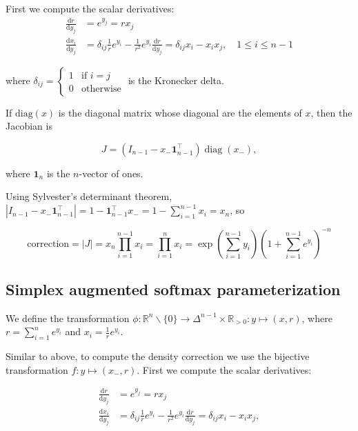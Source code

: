 \documentclass[twoside]{article}
\begin{document}
First we compute the scalar derivatives:
$$
\begin{aligned}
    \frac{\mathrm{d} r}{\mathrm{d} y_j} &= e^{y_j} = r x_j\\
    \frac{\mathrm{d} x_i}{\mathrm{d} y_j} &= \delta_{ij} \frac{1}{r} e^{y_i} - \frac{1}{r^2} e^{y_i} \frac{\mathrm{d} r}{\mathrm{d} y_j} = \delta_{ij} x_i - x_i x_j, \quad 1 \le i \le n-1
\end{aligned}
$$

where $\delta_{ij} = \begin{cases} 1 &\text{if } i = j \\ 0 &\text{otherwise}\end{cases}$ is the Kronecker delta.

If $\mathrm{diag}(x)$ is the diagonal matrix whose diagonal are the elements of $x$, then the Jacobian is

$$J = (I_{n-1} - x_- \boldsymbol{1}_{n-1}^\top) \operatorname{diag}(x_-),$$

where $\boldsymbol{1}_n$ is the $n$-vector of ones.

Using Sylvester's determinant theorem, $|I_{n-1} - x_- \boldsymbol{1}_{n-1}^\top| = 1 - \boldsymbol{1}_{n-1}^\top x_- = 1 - \sum_{i=1}^{n-1} x_i = x_n$, so

$$\mathrm{correction} = |J| = x_n \prod_{i=1}^{n-1} x_i = \prod_{i=1}^{n} x_i = \exp\left(\sum_{i=1}^{n-1} y_i\right) \left(1 + \sum_{i=1}^{n-1} e^{y_i}\right)^{-n}$$

\subsection{Simplex augmented softmax parameterization}

We define the transformation $\phi: \mathbb{R}^n \backslash \{0\} \to \Delta^{n-1} \times \mathbb{R}_{>0}: y \mapsto (x, r)$,
where $r = \sum_{i=1}^n e^{y_i}$ and $x_i = \frac{1}{r} e^{y_i}$.

Similar to above, to compute the density correction we use the bijective transformation $f: y \mapsto (x_-, r)$.
First we compute the scalar derivatives:

$$
\begin{aligned}
    \frac{\mathrm{d} r}{\mathrm{d} y_j} &= e^{y_j} = r x_j\\
    \frac{\mathrm{d} x_i}{\mathrm{d} y_j} &= \delta_{ij} \frac{1}{r} e^{y_i} - \frac{1}{r^2} e^{y_i} \frac{\mathrm{d} r}{\mathrm{d} y_j} = \delta_{ij} x_i - x_i x_j,
\end{aligned}
$$
\end{document}
